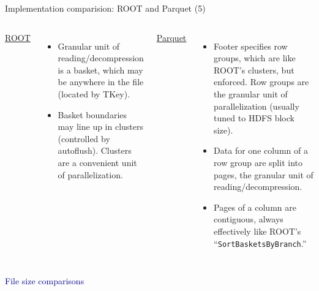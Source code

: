 \documentclass[aspectratio=169]{beamer}
\begin{document}
\begin{frame}{Implementation comparision: ROOT and Parquet (5)}
\vspace{0.5 cm}
\begin{columns}
{\large \underline{ROOT}}

\begin{itemize}
\item Granular unit of reading/decompression is a basket, which may be anywhere in the file (located by TKey).

\item Basket boundaries may line up in clusters (controlled by autoflush). Clusters are a convenient unit of parallelization.
\end{itemize}

{\large \underline{Parquet}}

\begin{itemize}
\item Footer specifies row groups, which are like ROOT's clusters, but enforced. Row groups are the granular unit of parallelization (usually tuned to HDFS block size).

\item Data for one column of a row group are split into pages, the granular unit of reading/decompression.

\item Pages of a column are contiguous, always effectively like ROOT's ``{\tt\small SortBasketsByBranch}.''
\end{itemize}
\end{columns}
\end{frame}

\begin{frame}{}
\vspace{0.5 cm}
\begin{center}
\Huge \textcolor{darkblue}{File size comparisons}
\end{center}
\end{frame}
\end{document}
